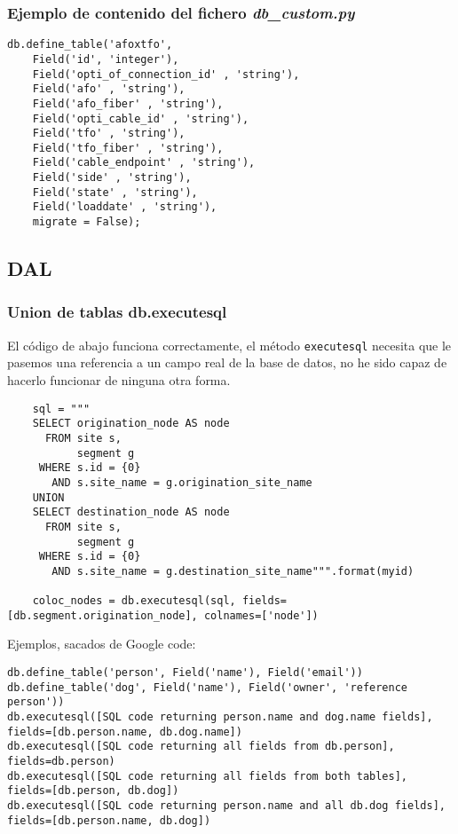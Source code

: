 \documentclass[12pt,spanish,]{article}
\begin{document}
\subsubsection{\texorpdfstring{Ejemplo de contenido del fichero
\emph{db\_custom.py}}{Ejemplo de contenido del fichero db\_custom.py}}\label{ejemplo-de-contenido-del-fichero-db_custom.py}

\begin{verbatim}
db.define_table('afoxtfo',
    Field('id', 'integer'),
    Field('opti_of_connection_id' , 'string'),
    Field('afo' , 'string'),
    Field('afo_fiber' , 'string'),
    Field('opti_cable_id' , 'string'),
    Field('tfo' , 'string'),
    Field('tfo_fiber' , 'string'),
    Field('cable_endpoint' , 'string'),
    Field('side' , 'string'),
    Field('state' , 'string'),
    Field('loaddate' , 'string'),
    migrate = False);
\end{verbatim}

\subsection{DAL}\label{dal}

\subsubsection{Union de tablas
db.executesql}\label{union-de-tablas-db.executesql}

El código de abajo funciona correctamente, el método \texttt{executesql}
necesita que le pasemos una referencia a un campo real de la base de
datos, no he sido capaz de hacerlo funcionar de ninguna otra forma.

\begin{verbatim}
    sql = """
    SELECT origination_node AS node
      FROM site s,
           segment g
     WHERE s.id = {0}
       AND s.site_name = g.origination_site_name
    UNION
    SELECT destination_node AS node
      FROM site s,
           segment g
     WHERE s.id = {0}
       AND s.site_name = g.destination_site_name""".format(myid)

    coloc_nodes = db.executesql(sql, fields=[db.segment.origination_node], colnames=['node'])
\end{verbatim}

Ejemplos, sacados de Google code:

\begin{verbatim}
db.define_table('person', Field('name'), Field('email'))
db.define_table('dog', Field('name'), Field('owner', 'reference person'))
db.executesql([SQL code returning person.name and dog.name fields], fields=[db.person.name, db.dog.name])
db.executesql([SQL code returning all fields from db.person], fields=db.person)
db.executesql([SQL code returning all fields from both tables], fields=[db.person, db.dog])
db.executesql([SQL code returning person.name and all db.dog fields], fields=[db.person.name, db.dog])
\end{verbatim}
\end{document}
